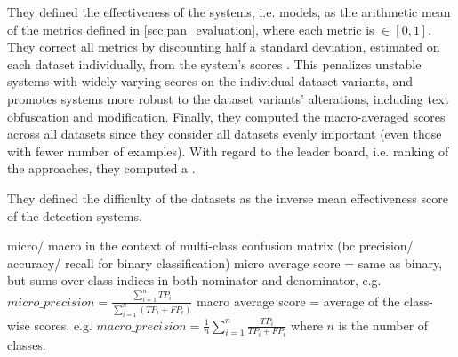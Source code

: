 They defined the effectiveness of the systems, i.e. models, as the arithmetic mean of the metrics defined in \autoref{sec:pan_evaluation}, 
where each metric is $\in [0, 1]$.
They correct all metrics by discounting half a standard deviation, estimated on each dataset individually, 
from the system's scores .
This penalizes unstable systems with widely varying scores on the individual dataset variants, 
and promotes systems more robust to the dataset variants' alterations, including text obfuscation and modification.
Finally, they computed the macro-averaged scores across all datasets since they consider all datasets evenly important 
(even those with fewer number of examples).
With regard to the leader board, i.e. ranking of the approaches, they computed a .

They defined the difficulty of the datasets as the inverse mean effectiveness score of the detection systems.


micro/ macro in the context of multi-class confusion matrix (bc precision/ accuracy/ recall for binary classification)
micro average score = same as binary, but sums over class indices in both nominator and denominator, e.g.
$micro\_precision = \frac{\sum_{i=1}^n TP_i}{\sum_{i=1}^n (TP_i + FP_i)}$
macro average score = average of the class-wise scores, e.g.
$macro\_precision = \frac{1}{n} \sum_{i=1}^n \frac{TP_i}{TP_i + FP_i}$
where $n$ is the number of classes.